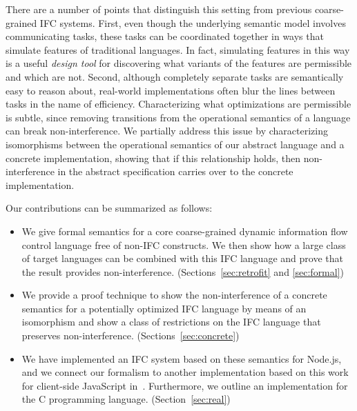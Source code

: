 There are a number of points that distinguish this setting from
previous coarse-grained IFC systems.
%
First, even though the underlying semantic model involves communicating
tasks, these tasks can be coordinated together in ways that simulate
features of traditional languages.
%
In fact, simulating
features in this way is a useful \emph{design tool} for discovering
what variants of the features are permissible and which are not.
%
Second, although completely separate tasks are semantically easy to
reason about, real-world implementations often blur the lines between
tasks in the name of efficiency.
Characterizing what optimizations are permissible is subtle, since
removing transitions from the operational semantics of a language can
break non-interference.  We partially address this issue
by characterizing isomorphisms between the operational semantics of our
abstract language and a concrete implementation, showing that if this
relationship holds, then non-interference in the abstract specification
carries over to the concrete implementation.

Our contributions can be summarized as follows:
\begin{itemize}
  \item We give formal semantics for a core coarse-grained
  dynamic information flow control language free of non-IFC constructs.
  We then show how a large class of target languages can be combined
  with this IFC language and prove that the result provides
  non-interference. (Sections~\ref{sec:retrofit} and \ref{sec:formal})
  \item We provide a proof technique to show the non-interference
  of a concrete semantics for a potentially optimized IFC language
  by means of an isomorphism and show a class of restrictions on
  the IFC language that preserves non-interference. (Sections~\ref{sec:concrete})
  \item We have implemented an IFC system based on these semantics
  for Node.js, and we connect our formalism to another implementation
  based on this work
  for client-side JavaScript in~\cite{swapi}.
  Furthermore, we outline an implementation for the C programming
  language.
  (Section~\ref{sec:real})
\end{itemize}

